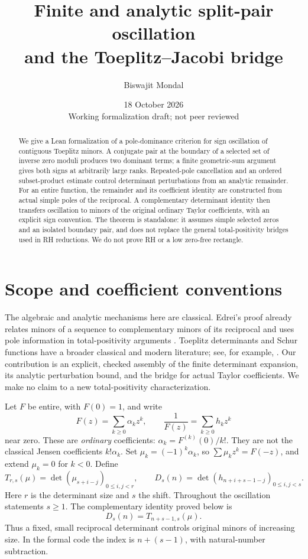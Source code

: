 \documentclass[11pt]{amsart}
\title[Split-pair oscillation and the Toeplitz--Jacobi bridge]{Finite and analytic split-pair oscillation\\and the Toeplitz--Jacobi bridge}
\author{Biswajit Mondal}
\date{18 October 2026\\Working formalization draft; not peer reviewed}
\begin{document}
\begin{abstract}
We give a Lean formalization of a pole-dominance criterion for sign oscillation of contiguous Toeplitz minors. A conjugate pair at the boundary of a selected set of inverse zero moduli produces two dominant terms; a finite geometric-sum argument gives both signs at arbitrarily large ranks. Repeated-pole cancellation and an ordered subset-product estimate control determinant perturbations from an analytic remainder. For an entire function, the remainder and its coefficient identity are constructed from actual simple poles of the reciprocal. A complementary determinant identity then transfers oscillation to minors of the original ordinary Taylor coefficients, with an explicit sign convention. The theorem is standalone: it assumes simple selected zeros and an isolated boundary pair, and does not replace the general total-positivity bridges used in RH reductions. We do not prove RH or a low zero-free rectangle.
\end{abstract}
\maketitle

\section{Scope and coefficient conventions}
The algebraic and analytic mechanisms here are classical. Edrei's proof already relates minors of a sequence to complementary minors of its reciprocal and uses pole information in total-positivity arguments \cite{edrei}. Toeplitz determinants and Schur functions have a broader classical and modern literature; see, for example, \cite{bumpdiaconis}. Our contribution is an explicit, checked assembly of the finite determinant expansion, its analytic perturbation bound, and the bridge for actual Taylor coefficients. We make no claim to a new total-positivity characterization.

Let $F$ be entire, with $F(0)=1$, and write
\[
 F(z)=\sum_{k\ge0}\alpha_k z^k,\qquad
 \frac1{F(z)}=\sum_{k\ge0}h_k z^k
\]
near zero. These are \emph{ordinary} coefficients:
$\alpha_k=F^{(k)}(0)/k!$. They are not the classical Jensen coefficients $k!\alpha_k$.
Set $\mu_k=(-1)^k\alpha_k$, so $\sum\mu_kz^k=F(-z)$, and extend $\mu_k=0$ for $k<0$. Define
\[
 T_{r,s}(\mu)=\det(\mu_{s+i-j})_{0\le i,j<r},\qquad
 D_s(n)=\det(h_{n+i+s-1-j})_{0\le i,j<s}.
\]
Here $r$ is the determinant size and $s$ the shift. Throughout the oscillation statements $s\ge1$. The complementary identity proved below is
\begin{equation}\label{eq:jacobi}
 D_s(n)=T_{n+s-1,s}(\mu).
\end{equation}
Thus a fixed, small reciprocal determinant controls original minors of increasing size. In the formal code the index is $n+(s-1)$, with natural-number subtraction.
\end{document}
